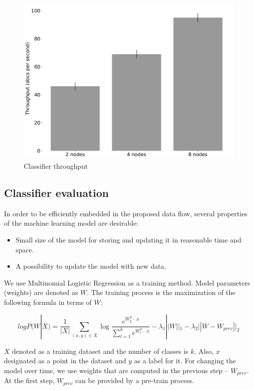 \begin{figure}[htbp]
  \centering
  \includegraphics[scale=0.25]{pics/classifier_throughput}
  \caption{Classifier throughput}
  \label {throughput}
\end{figure}

\subsection{Classifier evaluation}

In order to be efficiently embedded in the proposed data flow, several properties of the machine learning model are desirable:
\begin{itemize}
     \item Small size of the model for storing and updating it in reasonable time and space.
     \item A possibility to update the model with new data.
\end{itemize}

We use Multinomial Logistic Regression as a training method. Model parameters (weights) are denoted as $W$. The training process is the maximization of the following formula in terms of $W$:

$$ logP(W | X) = \frac{1}{|X|} \sum \limits_{(x, y) \in X} \log \frac{e^{{W_y^T \cdot \; x}}}{\sum \limits_{l = 1}^{k}  e^{{W_{l}^T \cdot \; x}}} - \lambda_1 ||W||_1 - \lambda_2 ||W - W_{prev}||_2 $$ 

$X$ denoted as a training dataset and the number of classes is $k$. Also, $x$ designated as a point in the dataset and $y$ as a label for it. For changing the model over time, we use weights that are computed in the previous step -- $W_{prev}$. At the first step, $W_{prev}$ can be provided by a pre-train process.

